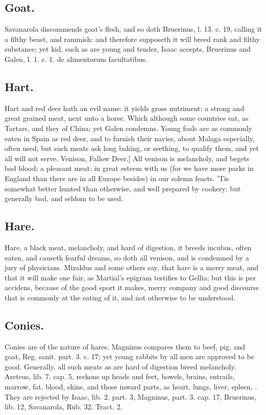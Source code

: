{\subsection{Goat.}
Savanarola discommends goat's flesh, and so doth
Bruerinus, l. 13. c. 19, calling it a filthy beast, and rammish:
and therefore supposeth it will breed rank and filthy substance; yet
kid, such as are young and tender, Isaac accepts, Bruerinus and Galen,
l. 1. c. 1. de alimentorum facultatibus.
\subsection{Hart.}
Hart and red deer hath an evil name: it yields gross
nutriment: a strong and great grained meat, next unto a horse. Which
although some countries eat, as Tartars, and they of China; yet 
Galen condemns. Young foals are as commonly eaten in Spain as red deer,
and to furnish their navies, about Malaga especially, often used; but
such meats ask long baking, or seething, to qualify them, and yet all
will not serve.
Venison, Fallow Deer.] All venison is melancholy, and begets bad blood;
a pleasant meat: in great esteem with us (for we have more parks in
England than there are in all Europe besides) in our solemn feasts.
'Tis somewhat better hunted than otherwise, and well prepared by
cookery; but generally bad, and seldom to be used.
\subsection{Hare.}
Hare, a black meat, melancholy, and hard of digestion, it
breeds incubus, often eaten, and causeth fearful dreams, so doth all
venison, and is condemned by a jury of physicians. Mizaldus and some
others say, that hare is a merry meat, and that it will make one fair,
as Martial's epigram testifies to Gellia; but this is per accidens,
because of the good sport it makes, merry company and good discourse
that is commonly at the eating of it, and not otherwise to be
understood.

\subsection{Conies.}
Conies are of the nature of hares. Magninus compares
them to beef, pig, and goat, Reg. sanit. part. 3. c. 17; yet young
rabbits by all men are approved to be good.
Generally, all such meats as are hard of digestion breed melancholy.
Areteus, lib. 7. cap. 5, reckons up heads and feet, bowels,
brains, entrails, marrow, fat, blood, skins, and those inward parts, as
heart, lungs, liver, spleen, \etc{}. They are rejected by Isaac, lib. 2.
part. 3, Magninus, part. 3. cap. 17, Bruerinus, lib. 12, Savanarola,
Rub. 32. Tract. 2.

}
